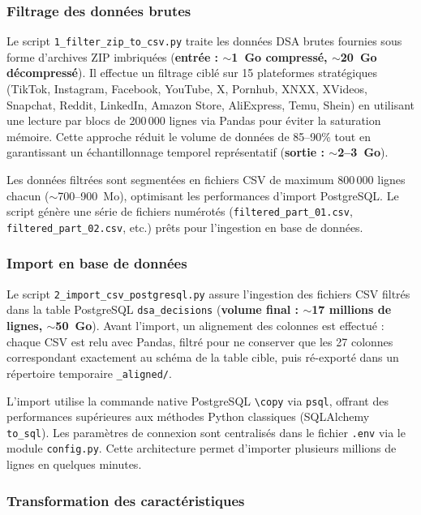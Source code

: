 \documentclass[10pt,twocolumn,a4paper]{article}
\begin{document}
\subsubsection{Filtrage des données brutes}

Le script \texttt{1\_filter\_zip\_to\_csv.py} traite les données DSA brutes fournies sous forme d'archives ZIP imbriquées (\textbf{entrée : $\sim$1~Go compressé, $\sim$20~Go décompressé}). Il effectue un filtrage ciblé sur 15 plateformes stratégiques (TikTok, Instagram, Facebook, YouTube, X, Pornhub, XNXX, XVideos, Snapchat, Reddit, LinkedIn, Amazon Store, AliExpress, Temu, Shein) en utilisant une lecture par blocs de 200\,000 lignes via Pandas pour éviter la saturation mémoire. Cette approche réduit le volume de données de 85--90\% tout en garantissant un échantillonnage temporel représentatif (\textbf{sortie : $\sim$2--3~Go}).

Les données filtrées sont segmentées en fichiers CSV de maximum 800\,000 lignes chacun ($\sim$700--900~Mo), optimisant les performances d'import PostgreSQL. Le script génère une série de fichiers numérotés (\texttt{filtered\_part\_01.csv}, \texttt{filtered\_part\_02.csv}, etc.) prêts pour l'ingestion en base de données.

\subsubsection{Import en base de données}

Le script \texttt{2\_import\_csv\_postgresql.py} assure l'ingestion des fichiers CSV filtrés dans la table PostgreSQL \texttt{dsa\_decisions} (\textbf{volume final : $\sim$17 millions de lignes, $\sim$50~Go}). Avant l'import, un alignement des colonnes est effectué : chaque CSV est relu avec Pandas, filtré pour ne conserver que les 27 colonnes correspondant exactement au schéma de la table cible, puis ré-exporté dans un répertoire temporaire \texttt{\_aligned/}.

L'import utilise la commande native PostgreSQL \texttt{\textbackslash copy} via \texttt{psql}, offrant des performances supérieures aux méthodes Python classiques (SQLAlchemy \texttt{to\_sql}). Les paramètres de connexion sont centralisés dans le fichier \texttt{.env} via le module \texttt{config.py}. Cette architecture permet d'importer plusieurs millions de lignes en quelques minutes.

\subsubsection{Transformation des caractéristiques}
\end{document}
